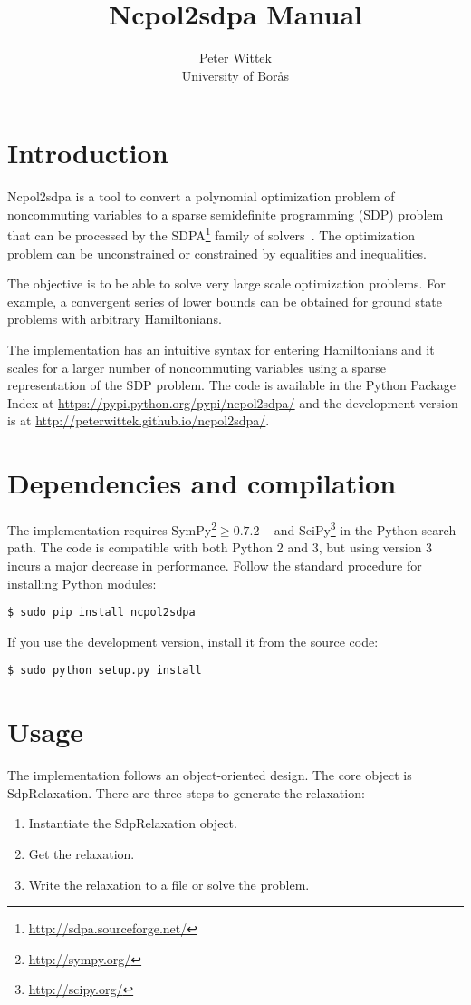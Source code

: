 \documentclass{article}
\title{Ncpol2sdpa Manual}
\author{Peter Wittek\\
        \small{University of Bor\aa{}s}
}
\date{}
\begin{document}
\maketitle

\section{Introduction}
Ncpol2sdpa is a tool to convert a polynomial optimization problem of noncommuting variables to a sparse semidefinite programming (SDP) problem that can be processed by the SDPA\footnote{\url{http://sdpa.sourceforge.net/}} family of solvers~\cite{yamashita2003sdpara}. The optimization problem can be unconstrained or constrained by equalities and inequalities.

The objective is to be able to solve very large scale optimization problems. For example, a convergent series of lower bounds can be obtained for ground state problems with arbitrary Hamiltonians.

The implementation has an intuitive syntax for entering Hamiltonians and it scales for a larger number of noncommuting variables using a sparse representation of the SDP problem. The code is available in the Python Package Index at \url{https://pypi.python.org/pypi/ncpol2sdpa/} and the development version is at \url{http://peterwittek.github.io/ncpol2sdpa/}.

\section{Dependencies and compilation}
The implementation requires SymPy\footnote{\url{http://sympy.org/}}$\geq0.7.2$ ~\citep{joyner2012open} and SciPy\footnote{\url{http://scipy.org/}} in the Python search path. The code is compatible with both Python 2 and 3, but using version 3 incurs a major decrease in performance. Follow the standard procedure for installing Python modules:
\begin{verbatim}
$ sudo pip install ncpol2sdpa
\end{verbatim}
If you use the development version, install it from the source code:
\begin{verbatim}
$ sudo python setup.py install
\end{verbatim}

\section{Usage}
The implementation follows an object-oriented design. The core object is SdpRelaxation. There are three steps to generate the relaxation:
\begin{enumerate}
  \item Instantiate the SdpRelaxation object.
  \item Get the relaxation.
  \item Write the relaxation to a file or solve the problem.
\end{enumerate}
\end{document}
